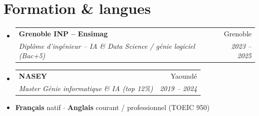 \documentclass[a4paper,10.5pt]{article}
\makeatletter
\newcommand{\resumeSubheading}[4]{%
  \vspace{3pt}\item
  \begin{tabular*}{0.97\textwidth}[t]{l@{\extracolsep{\fill}}r}
    \textbf{#1} & #2 \\
    \textit{\small #3} & \textit{\small #4} \\
  \end{tabular*}\vspace{1pt}
}
\newcommand{\resumeSubHeadingListStart}{\begin{itemize}[leftmargin=0.08in, label={}]}
\newcommand{\resumeSubHeadingListEnd}{\end{itemize}}
\makeatother
\begin{document}
\section{Formation \& langues}
\resumeSubHeadingListStart
  \resumeSubheading
    {Grenoble INP -- Ensimag}{Grenoble}
    {Dipl\^ome d'ing\'enieur -- IA \& Data Science / g\'enie logiciel (Bac+5)}{2023 -- 2025}
  \resumeSubheading
    {NASEY}{Yaound\'e}
    {Master G\'enie informatique \& IA (top 12\%)}{2019 -- 2024}
\resumeSubHeadingListEnd
\begin{itemize}[leftmargin=0.08in, label={}]
\item \textbf{Fran\c{c}ais} natif $\cdot$ \textbf{Anglais} courant / professionnel (TOEIC 950)
\end{itemize}
\end{document}
